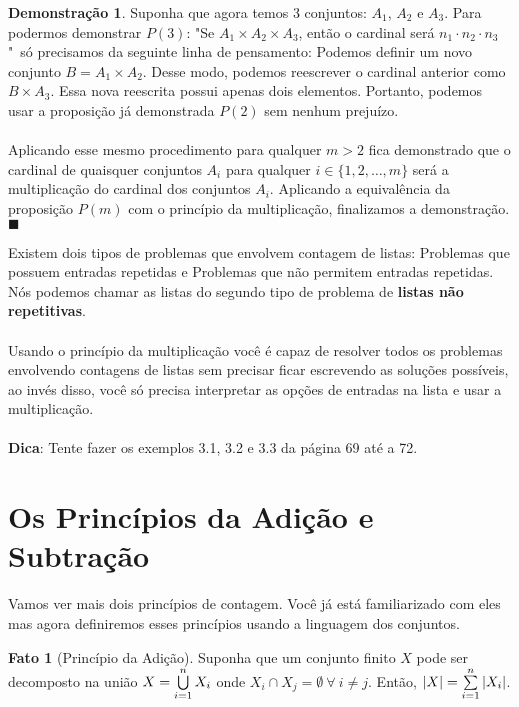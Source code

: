 \documentclass[a4paper,11pt,oneside]{book}
\theoremstyle{definition}
\theoremstyle{break}
\newtheorem{fact}{Fato}[section]
\newtheorem{demonstration}{Demonstração}[section]
\begin{document}
\begin{demonstration}
Suponha que agora temos 3 conjuntos: $A_1$, $A_2$ e $A_3$. Para podermos demonstrar $P(3)$: "Se $A_1 \times A_2 \times A_3$, então o cardinal será  $n_1 \cdot n_2 \cdot n_3$"\  só precisamos da seguinte linha de pensamento: Podemos definir um novo conjunto $B = A_1 \times A_2$. Desse modo, podemos reescrever o cardinal anterior como $B \times A_3$. Essa nova reescrita possui apenas dois elementos. Portanto, podemos usar a proposição já demonstrada $P(2)$ sem nenhum prejuízo.
\\
\\
Aplicando esse mesmo procedimento para qualquer $m > 2$ fica demonstrado que o cardinal de quaisquer conjuntos $A_i$ para qualquer $i \in \{1,2,\dots,m\}$ será a multiplicação do cardinal dos conjuntos $A_i$. Aplicando a equivalência da proposição $P(m)$ com o princípio da multiplicação, finalizamos a demonstração. $\blacksquare$
\end{demonstration}

Existem dois tipos de problemas que envolvem contagem de listas: Problemas que possuem entradas repetidas e Problemas que não permitem entradas repetidas. Nós podemos chamar as listas do segundo tipo de problema de \textbf{listas não repetitivas}.
\\
\\
Usando o princípio da multiplicação você é capaz de resolver todos os problemas envolvendo contagens de listas sem precisar ficar escrevendo as soluções possíveis, ao invés disso, você só precisa interpretar as opções de entradas na lista e usar a multiplicação.
\\
\\
\textbf{Dica}: Tente fazer os exemplos 3.1, 3.2 e 3.3 da página 69 até a 72.

\section{Os Princípios da Adição e Subtração}

Vamos ver mais dois princípios de contagem. Você já está familiarizado com eles mas agora definiremos esses princípios usando a linguagem dos conjuntos.

\begin{fact}[Princípio da Adição]
Suponha que um conjunto finito $X$ pode ser decomposto na união $X = \bigcup_{i = 1}^{n}\limits X_i$ onde $ X_i \cap X_j = \emptyset \ \forall \ i \neq j$. Então, $|X| = \sum_{i = 1}^{n}\limits |X_i|$.
\end{fact}
\end{document}
